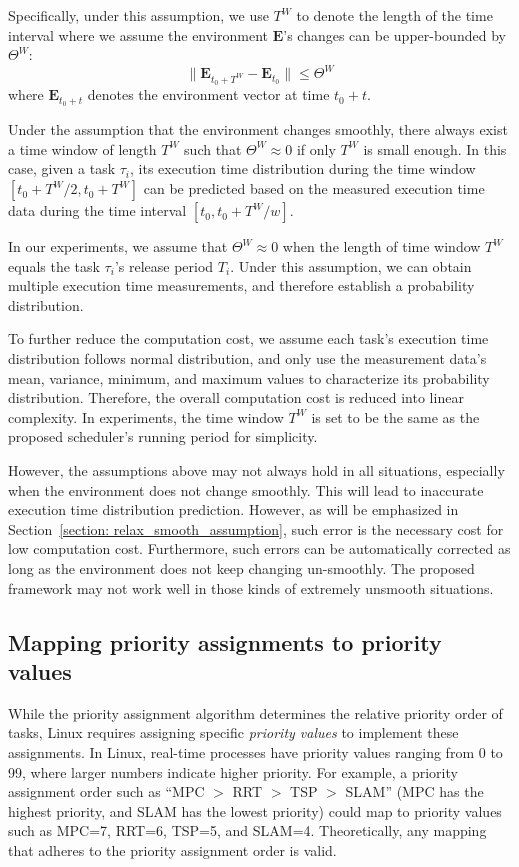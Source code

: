 Specifically, under this assumption, we use $T^W$ to denote the length of the time interval where we assume the environment $\textbf{E}$'s changes can be upper-bounded by $\Theta^W$:
\begin{equation}
    \|\textbf{E}_{t_0+T^W} - \textbf{E}_{t_0} \| \leq \Theta^W
\end{equation}
where $\textbf{E}_{t_0+t}$ denotes the environment vector at time $t_0+t$.

Under the assumption that the environment changes smoothly, there always exist a time window of length $T^W$ such that $\Theta^W \approx 0$ if only $T^W$ is small enough.
In this case, given a task $\tau_i$, its execution time distribution during the time window $[t_0 + T^W/2, t_0 + T^W]$ can be predicted based on the measured execution time data during the time interval $[t_0, t_0 + T^W/w]$.

In our experiments, we assume that $\Theta^W \approx 0$ when the length of time window $T^W$ equals the task $\tau_i$'s release period $T_i$.
Under this assumption, we can obtain multiple execution time measurements, and therefore establish a probability distribution.

To further reduce the computation cost, we assume each task's execution time distribution follows normal distribution, and only use the measurement data's mean, variance, minimum, and maximum values to characterize its probability distribution.
Therefore, the overall computation cost is reduced into linear complexity.
In experiments, the time window $T^W$ is set to be the same as the proposed scheduler's running period for simplicity.

However, the assumptions above may not always hold in all situations, especially when the environment does not change smoothly.
This will lead to inaccurate execution time distribution prediction.
However, as will be emphasized in Section~\ref{section: relax_smooth_assumption}, such error is the necessary cost for low computation cost.
Furthermore, such errors can be automatically corrected as long as the environment does not keep changing un-smoothly.
The proposed framework may not work well in those kinds of extremely unsmooth situations.


\subsection{Mapping priority assignments to priority values}
\label{section_pa_values}
While the priority assignment algorithm determines the relative priority order of tasks, Linux requires assigning specific \textit{priority values} to implement these assignments.
In Linux, real-time processes have priority values ranging from 0 to 99, where larger numbers indicate higher priority.
For example, a priority assignment order such as ``MPC $>$ RRT $>$ TSP $>$ SLAM'' (MPC has the highest priority, and SLAM has the lowest priority) could map to priority values such as MPC=7, RRT=6, TSP=5, and SLAM=4.
Theoretically, any mapping that adheres to the priority assignment order is valid.

